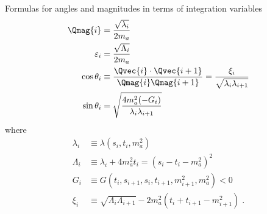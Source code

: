 \reversemarginpar{}
\begin{bluenv}{Formulas for angles and magnitudes in terms of integration variables}
    \vspace{-2ex}
    \begin{align}
        \Qmag{i} &= \frac{\sqrt{\lambda_i}}{2 m_a} \label{eq:B-Qmag-formula}\\
        \varepsilon_i &= \frac{\sqrt{\Lambda_i}}{2 m_a} \label{eq:B-epsilon-formula}\\
        \cos \theta_i &\equiv \frac{\Qvec{i}\cdot\Qvec{i+1}}{\Qmag{i}\Qmag{i+1}} 
            =  \frac{\xi_i}{\sqrt{\lambda_i \lambda_{i+1}}} \label{eq:B-costheta-formula}\\
        \sin\theta_i &= \sintheta{i}{i+1} \label{eq:B-sintheta-formula}
    \end{align}
    where
    \begin{align}
        \label{eq:app-lambda-definitions}
        \lambda_i &\equiv \lambda(s_i, t_i, m_a^2) \\
        \Lambda_i &\equiv \lambda_i + 4 m_a^2 t_i = (s_i - t_i - m_a^2)^2 \\
        G_i &\equiv G(t_i, s_{i+1}, s_i, t_{i+1}, m_{i+1}^2, m_a^2) < 0 \\
        \xi_i &\equiv \sqrt{\Lambda_i \Lambda_{i+1}} - 2 m_a^2 (t_i + t_{i+1} - m_{i+1}^2) \; .
    \end{align}
\end{bluenv}


